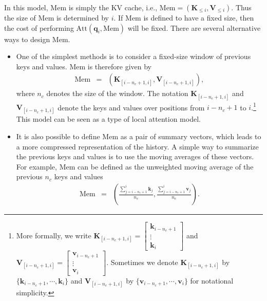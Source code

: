 In this model, $\mathrm{Mem}$ is simply the KV cache, i.e., $\mathrm{Mem} = (\mathbf{K}_{\le i}, \mathbf{V}_{\le i})$. Thus the size of $\mathrm{Mem}$ is determined by $i$. If $\mathrm{Mem}$ is defined to have a fixed size, then the cost of performing $\mathrm{Att}(\mathbf{q}_i,\mathrm{Mem})$ will be fixed. There are several alternative ways to design $\mathrm{Mem}$.

\begin{itemize}
\item \vspace{0.5em} One of the simplest methods is to consider a fixed-size window of previous keys and values. $\mathrm{Mem}$ is therefore given by
    \begin{eqnarray}
    \mathrm{Mem} & = & (\mathbf{K}_{[i - n_c + 1,i]},\mathbf{V}_{[i - n_c + 1,i]}),
    \end{eqnarray}
    \noindent where $n_c$ denotes the size of the window. The notation $\mathbf{K}_{[i - n_c + 1,i]}$ and $\mathbf{V}_{[i - n_c + 1,i]}$ denote the keys and values over positions from $i-n_c+1$ to $i$.\footnote{More formally, we write $\mathbf{K}_{[i - n_c + 1,i]} = \begin{bmatrix} \mathbf{k}_{i - n_c + 1} \\ \vdots \\ \mathbf{k}_{i} \end{bmatrix}$ and $\mathbf{V}_{[i - n_c + 1,i]} = \begin{bmatrix} \mathbf{v}_{i - n_c + 1} \\ \vdots \\ \mathbf{v}_{i} \end{bmatrix}$. Sometimes we denote $\mathbf{K}_{[i - n_c + 1,i]}$ by $\{\mathbf{k}_{i - n_c + 1},\cdots,\mathbf{k}_{i}\}$ and $\mathbf{V}_{[i - n_c + 1,i]}$ by $\{\mathbf{v}_{i - n_c + 1},\cdots,\mathbf{v}_{i}\}$ for notational simplicity.} This model can be seen as a type of local attention model.
\item \vspace{0.5em} It is also possible to define $\mathrm{Mem}$ as a pair of summary vectors, which leads to a more compressed representation of the history. A simple way to summarize the previous keys and values is to use the moving averages of these vectors. For example, $\mathrm{Mem}$ can be defined as the unweighted moving average of the previous $n_c$ keys and values
    \begin{eqnarray}
    \mathrm{Mem} & = & \left(\frac{\sum_{j=i - n_c + 1}^{i} \mathbf{k}_{j}}{n_c} , \frac{\sum_{j=i - n_c + 1}^{i} \mathbf{v}_{j}}{n_c} \right).
    \end{eqnarray}


\end{itemize}
